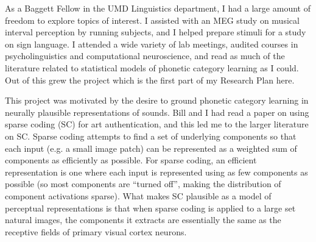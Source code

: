 \documentclass[12pt]{article}
\begin{document}
As a Baggett Fellow in the UMD Linguistics department, I had a large amount of freedom to explore topics of interest.  I assisted with an MEG study on musical interval perception by running subjects, and I helped prepare stimuli for a study on sign language.  I attended a wide variety of lab meetings, audited courses in psycholinguistics and computational neuroscience, and read as much of the literature related to statistical models of phonetic category learning as I could.  Out of this grew the project which is the first part of my Research Plan here.

This project was motivated by the desire to ground phonetic category learning in neurally plausible representations of sounds.  Bill and I had read a paper on using sparse coding (SC) for art authentication, and this led me to the larger literature on SC.  Sparse coding attempts to find a set of underlying components so that each input (e.g. a small image patch) can be represented as a weighted sum of components as efficiently as possible.  For sparse coding, an efficient representation is one where each input is represented using as few components as possible (so most components are ``turned off'', making the distribution of component activations sparse).  What makes SC plausible as a model of perceptual representations is that when sparse coding is applied to a large set natural images, the components it extracts are essentially the same as the receptive fields of primary visual cortex neurons.

\end{document}
